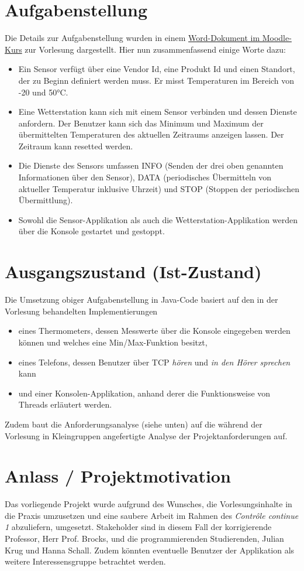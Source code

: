 \documentclass[a4paper]{report}
\begin{document}
\section{Aufgabenstellung}
Die Details zur Aufgabenstellung wurden in einem \href{https://moodle.htwsaar.de/mod/resource/view.php?id=58719}{Word-Dokument
im Moodle-Kurs} zur Vorlesung dargestellt.
Hier nun zusammenfassend einige Worte dazu:
\begin{itemize}
    \item Ein Sensor verfügt über eine Vendor Id, eine Produkt Id und einen Standort, der zu Beginn definiert werden muss. Er misst 
            Temperaturen im Bereich von -20 und 50°C. 
    \item Eine Wetterstation kann sich mit einem Sensor verbinden und dessen Dienste anfordern. Der Benutzer kann sich das Minimum und
            Maximum der übermittelten Temperaturen des aktuellen Zeitraums anzeigen lassen. Der Zeitraum kann resetted werden.
    \item Die Dienste des Sensors umfassen INFO (Senden der drei oben genannten Informationen über den Sensor), DATA (periodisches 
            Übermitteln von aktueller Temperatur inklusive Uhrzeit) und STOP (Stoppen der periodischen Übermittlung).
    \item Sowohl die Sensor-Applikation als auch die Wetterstation-Applikation werden über die Konsole gestartet und gestoppt.
\end{itemize}
\section{Ausgangszustand (Ist-Zustand)}
Die Umsetzung obiger Aufgabenstellung in Java-Code basiert auf den in der Vorlesung behandelten Implementierungen
\begin{itemize}
    \item eines Thermometers, dessen Messwerte über die Konsole eingegeben werden können und welches eine Min/Max-Funktion besitzt,
    \item eines Telefons, dessen Benutzer über TCP \textit{hören} und \textit{in den Hörer sprechen} kann
    \item und einer Konsolen-Applikation, anhand derer die Funktionsweise von Threads erläutert werden.
\end{itemize}
Zudem baut die Anforderungsanalyse (siehe unten) auf die während der Vorlesung in Kleingruppen angefertigte Analyse der 
Projektanforderungen auf.
\section{Anlass / Projektmotivation}
Das vorliegende Projekt wurde aufgrund des Wunsches, die Vorlesungsinhalte in die Praxis umzusetzen und eine saubere Arbeit im
Rahmen des \textit{Contrôle continue 1} abzuliefern, umgesetzt. Stakeholder sind in diesem Fall der korrigierende Professor, Herr Prof.
Brocks, und die programmierenden Studierenden, Julian Krug und Hanna Schall. Zudem könnten eventuelle Benutzer der Applikation als
weitere Interessensgruppe betrachtet werden.
\end{document}

